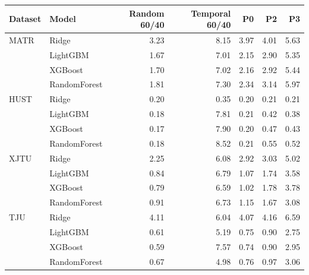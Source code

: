 \begin{tabular}{llrrrrr}
\toprule
Dataset & Model & Random 60/40 & Temporal 60/40 & P0 & P2 & P3 \\
\midrule
MATR & Ridge & 3.23 & 8.15 & 3.97 & 4.01 & 5.63 \\
 & LightGBM & 1.67 & 7.01 & 2.15 & 2.90 & 5.35 \\
 & XGBoost & 1.70 & 7.02 & 2.16 & 2.92 & 5.44 \\
 & RandomForest & 1.81 & 7.30 & 2.34 & 3.14 & 5.97 \\
HUST & Ridge & 0.20 & 0.35 & 0.20 & 0.21 & 0.21 \\
 & LightGBM & 0.18 & 7.81 & 0.21 & 0.42 & 0.38 \\
 & XGBoost & 0.17 & 7.90 & 0.20 & 0.47 & 0.43 \\
 & RandomForest & 0.18 & 8.52 & 0.21 & 0.55 & 0.52 \\
XJTU & Ridge & 2.25 & 6.08 & 2.92 & 3.03 & 5.02 \\
 & LightGBM & 0.84 & 6.79 & 1.07 & 1.74 & 3.58 \\
 & XGBoost & 0.79 & 6.59 & 1.02 & 1.78 & 3.78 \\
 & RandomForest & 0.91 & 6.73 & 1.15 & 1.67 & 3.08 \\
TJU & Ridge & 4.11 & 6.04 & 4.07 & 4.16 & 6.59 \\
 & LightGBM & 0.61 & 5.19 & 0.75 & 0.90 & 2.75 \\
 & XGBoost & 0.59 & 7.57 & 0.74 & 0.90 & 2.95 \\
 & RandomForest & 0.67 & 4.98 & 0.76 & 0.97 & 3.06 \\
\bottomrule
\end{tabular}
